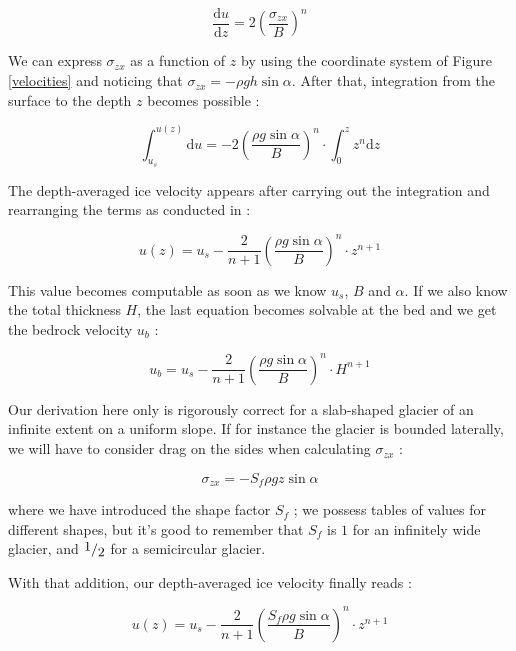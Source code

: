 \begin{equation}\frac{\mathrm{d} u}{\mathrm{d} z} = 2 \left( \frac{\sigma_{zx}}{B}\right)^n\end{equation}

We can express $\sigma_{zx}$ as a function of $z$ by using the coordinate system of Figure \ref{velocities} and noticing that $\sigma_{zx} = -\rho g h \sin{\alpha}$. After that, integration from the surface to the depth $z$ becomes possible :

\begin{equation}\int_{u_s}^{u(z)} \mathrm{d} u = -2 \left( \frac{\rho g \sin{\alpha}}{B}\right)^n \cdot \int_{0}^{z} z^n \mathrm{d} z\end{equation}


The depth-averaged ice velocity appears after carrying out the integration and rearranging the terms as conducted in \cite{Hooke2005} :

\begin{equation}u(z) = u_s - \frac{2}{n + 1} \left( \frac{\rho g \sin{\alpha}}{B}\right)^n \cdot z^{n+1}\end{equation}

This value becomes computable as soon as we know $u_s$, $B$ and $\alpha$. If we also know the total thickness $H$, the last equation becomes solvable at the bed and we get the bedrock velocity $u_b$ :

\begin{equation}u_b = u_s - \frac{2}{n + 1} \left( \frac{\rho g \sin{\alpha}}{B}\right)^n \cdot H^{n+1}\end{equation}

Our derivation here only is rigorously correct for a slab-shaped glacier of an infinite extent on a uniform slope. If for instance the glacier is bounded laterally, we will have to consider drag on the sides when calculating $\sigma_{zx}$ :

\begin{equation}\sigma_{zx} = -S_f \rho g z \sin{\alpha}\end{equation}

where we have introduced the shape factor $S_f$ ; we possess tables of values for different shapes, but it's good to remember that $S_f$ is $1$ for an infinitely wide glacier, and $\fraction{1}{2}$ for a semicircular glacier.

With that addition, our depth-averaged ice velocity finally reads :

\begin{equation}
\boxed{u(z) = u_s - \frac{2}{n + 1} \left( \frac{S_f \rho g \sin{\alpha}}{B}\right)^n \cdot z^{n+1}}
\end{equation}


